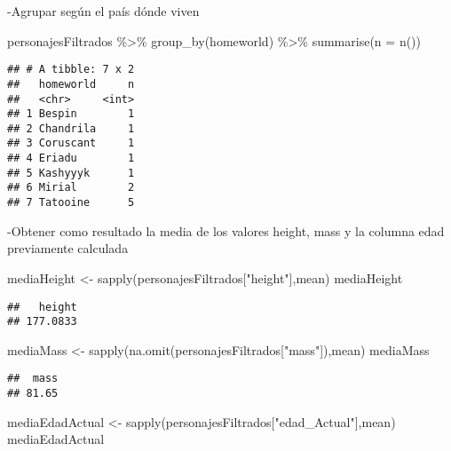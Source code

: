 \documentclass[
]{book}
\newenvironment{Shaded}{\begin{snugshade}}{\end{snugshade}}
\newcommand{\AttributeTok}[1]{\textcolor[rgb]{0.77,0.63,0.00}{#1}}
\newcommand{\FunctionTok}[1]{\textcolor[rgb]{0.00,0.00,0.00}{#1}}
\newcommand{\NormalTok}[1]{#1}
\newcommand{\OtherTok}[1]{\textcolor[rgb]{0.56,0.35,0.01}{#1}}
\newcommand{\SpecialCharTok}[1]{\textcolor[rgb]{0.00,0.00,0.00}{#1}}
\newcommand{\StringTok}[1]{\textcolor[rgb]{0.31,0.60,0.02}{#1}}
\begin{document}
-Agrupar según el país dónde viven

\begin{Shaded}
\begin{Highlighting}[]
\NormalTok{personajesFiltrados }\SpecialCharTok{\%\textgreater{}\%} \FunctionTok{group\_by}\NormalTok{(homeworld) }\SpecialCharTok{\%\textgreater{}\%} \FunctionTok{summarise}\NormalTok{(}\AttributeTok{n =} \FunctionTok{n}\NormalTok{())}
\end{Highlighting}
\end{Shaded}

\begin{verbatim}
## # A tibble: 7 x 2
##   homeworld     n
##   <chr>     <int>
## 1 Bespin        1
## 2 Chandrila     1
## 3 Coruscant     1
## 4 Eriadu        1
## 5 Kashyyyk      1
## 6 Mirial        2
## 7 Tatooine      5
\end{verbatim}

-Obtener como resultado la media de los valores height, mass y la columna edad previamente calculada

\begin{Shaded}
\begin{Highlighting}[]
\NormalTok{mediaHeight }\OtherTok{\textless{}{-}} \FunctionTok{sapply}\NormalTok{(personajesFiltrados[}\StringTok{"height"}\NormalTok{],mean)}
\NormalTok{mediaHeight}
\end{Highlighting}
\end{Shaded}

\begin{verbatim}
##   height 
## 177.0833
\end{verbatim}

\begin{Shaded}
\begin{Highlighting}[]
\NormalTok{mediaMass }\OtherTok{\textless{}{-}} \FunctionTok{sapply}\NormalTok{(}\FunctionTok{na.omit}\NormalTok{(personajesFiltrados[}\StringTok{"mass"}\NormalTok{]),mean)}
\NormalTok{mediaMass}
\end{Highlighting}
\end{Shaded}

\begin{verbatim}
##  mass 
## 81.65
\end{verbatim}

\begin{Shaded}
\begin{Highlighting}[]
\NormalTok{mediaEdadActual }\OtherTok{\textless{}{-}} \FunctionTok{sapply}\NormalTok{(personajesFiltrados[}\StringTok{"edad\_Actual"}\NormalTok{],mean)}
\NormalTok{mediaEdadActual}
\end{Highlighting}
\end{Shaded}
\end{document}
